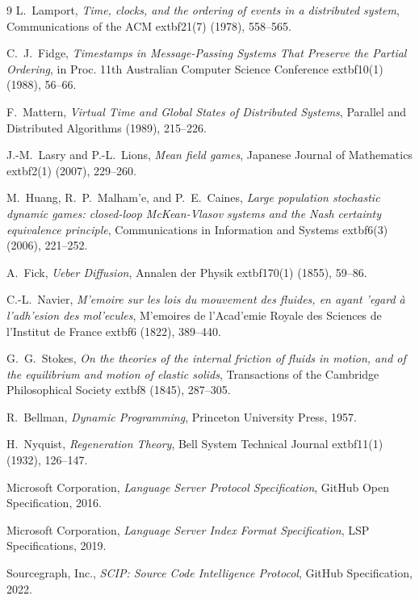 \documentclass[11pt,oneside]{book}
\theoremstyle{definition}
\theoremstyle{plain}
\theoremstyle{remark}
\begin{document}
\begin{thebibliography}{9}
L.~Lamport,
\emph{Time, clocks, and the ordering of events in a distributed system},
Communications of the ACM 	extbf{21}(7) (1978), 558--565. %

C.~J.~Fidge,
\emph{Timestamps in Message-Passing Systems That Preserve the Partial Ordering},
in Proc. 11th Australian Computer Science Conference 	extbf{10}(1) (1988), 56--66. %

F.~Mattern,
\emph{Virtual Time and Global States of Distributed Systems},
Parallel and Distributed Algorithms (1989), 215--226. %

J.-M.~Lasry and P.-L.~Lions,
\emph{Mean field games},
Japanese Journal of Mathematics 	extbf{2}(1) (2007), 229--260. %

M.~Huang, R.~P.~Malham'e, and P.~E.~Caines,
\emph{Large population stochastic dynamic games: closed-loop McKean-Vlasov systems and the Nash certainty equivalence principle},
Communications in Information and Systems 	extbf{6}(3) (2006), 221--252. %

A.~Fick,
\emph{Ueber Diffusion},
Annalen der Physik 	extbf{170}(1) (1855), 59--86. %

C.-L.~Navier,
\emph{M'emoire sur les lois du mouvement des fluides, en ayant 'egard \`a l'adh'esion des mol'ecules},
M'emoires de l'Acad'emie Royale des Sciences de l'Institut de France 	extbf{6} (1822), 389--440. %

G.~G.~Stokes,
\emph{On the theories of the internal friction of fluids in motion, and of the equilibrium and motion of elastic solids},
Transactions of the Cambridge Philosophical Society 	extbf{8} (1845), 287--305. %

R.~Bellman,
\emph{Dynamic Programming},
Princeton University Press, 1957. %

H.~Nyquist,
\emph{Regeneration Theory},
Bell System Technical Journal 	extbf{11}(1) (1932), 126--147. %

Microsoft Corporation,
\emph{Language Server Protocol Specification},
GitHub Open Specification, 2016. %

Microsoft Corporation,
\emph{Language Server Index Format Specification},
LSP Specifications, 2019. %

Sourcegraph, Inc.,
\emph{SCIP: Source Code Intelligence Protocol},
GitHub Specification, 2022. %


\end{thebibliography}
\end{document}
